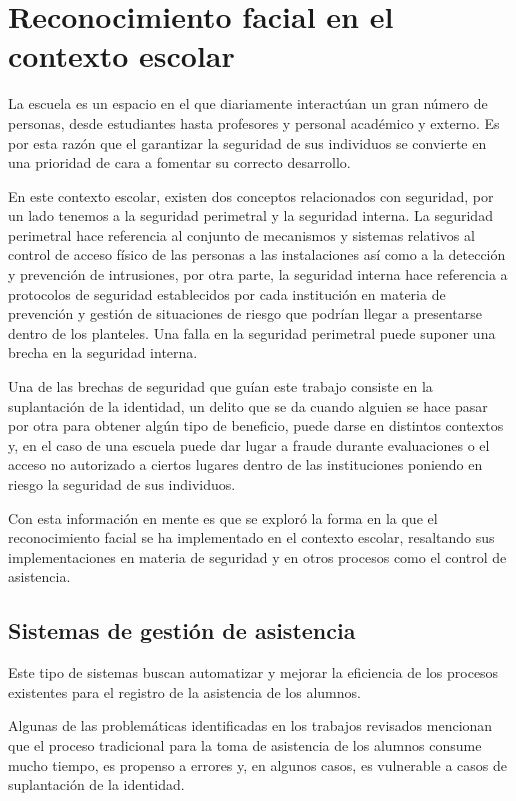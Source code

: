 \section{Reconocimiento facial en el contexto escolar}

La escuela es un espacio en el que diariamente interactúan un gran número de personas, desde estudiantes hasta profesores y personal académico y externo.
Es por esta razón que el garantizar la seguridad de sus individuos se convierte en una prioridad de cara a fomentar su correcto desarrollo.

En este contexto escolar, existen dos conceptos relacionados con seguridad, por un lado tenemos a la seguridad perimetral y la seguridad interna.
La seguridad perimetral hace referencia al conjunto de mecanismos y sistemas relativos al control de acceso físico de las personas a las instalaciones así como a la detección y prevención de intrusiones, por otra parte, la seguridad interna hace referencia a protocolos de seguridad establecidos por cada institución en materia de prevención y gestión de situaciones de riesgo que podrían llegar a presentarse dentro de los planteles. Una falla en la seguridad perimetral puede suponer una brecha en la seguridad interna.

Una de las brechas de seguridad que guían este trabajo consiste en la suplantación de la identidad, un delito que se da cuando alguien se hace pasar por otra para obtener algún tipo de beneficio, puede darse en distintos contextos y, en el caso de una escuela puede dar lugar a fraude durante evaluaciones o el acceso no autorizado a ciertos lugares dentro de las instituciones poniendo en riesgo la seguridad de sus individuos.

Con esta información en mente es que se exploró la forma en la que el reconocimiento facial se ha implementado en el contexto escolar, resaltando sus implementaciones en materia de seguridad y en otros procesos como el control de asistencia.

\subsection{Sistemas de gestión de asistencia}

Este tipo de sistemas buscan automatizar y mejorar la eficiencia de los procesos existentes para el registro de la asistencia de los alumnos.

Algunas de las problemáticas identificadas en los trabajos revisados mencionan que el proceso tradicional para la toma de asistencia de los alumnos consume mucho tiempo, es propenso a errores y, en algunos casos, es vulnerable a casos de suplantación de la identidad.

